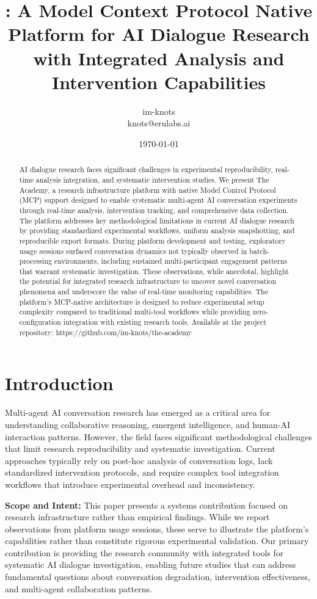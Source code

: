 \documentclass[11pt,letterpaper]{article}
\title{\theacademy{}: A Model Context Protocol Native Platform for AI Dialogue Research with Integrated Analysis and Intervention Capabilities}
\author{
im-knots \\
knots@erulabs.ai
}
\date{\today}
\newcommand{\theacademy}{The Academy}
\newcommand{\mcp}{MCP}
\begin{document}
\maketitle

\begin{abstract}
AI dialogue research faces significant challenges in experimental reproducibility, real-time analysis integration, and systematic intervention studies. We present \theacademy{}, a research infrastructure platform with native Model Control Protocol (\mcp{}) support designed to enable systematic multi-agent AI conversation experiments through real-time analysis, intervention tracking, and comprehensive data collection. The platform addresses key methodological limitations in current AI dialogue research by providing standardized experimental workflows, uniform analysis snapshotting, and reproducible export formats. During platform development and testing, exploratory usage sessions surfaced conversation dynamics not typically observed in batch-processing environments, including sustained multi-participant engagement patterns that warrant systematic investigation. These observations, while anecdotal, highlight the potential for integrated research infrastructure to uncover novel conversation phenomena and underscore the value of real-time monitoring capabilities. The platform's \mcp{}-native architecture is designed to reduce experimental setup complexity compared to traditional multi-tool workflows while providing zero-configuration integration with existing research tools.
Available at the project repository: https://github.com/im-knots/the-academy
\end{abstract}

\section{Introduction}

Multi-agent AI conversation research has emerged as a critical area for understanding collaborative reasoning, emergent intelligence, and human-AI interaction patterns. However, the field faces significant methodological challenges that limit research reproducibility and systematic investigation. Current approaches typically rely on post-hoc analysis of conversation logs, lack standardized intervention protocols, and require complex tool integration workflows that introduce experimental overhead and inconsistency.

\textbf{Scope and Intent:} This paper presents a systems contribution focused on research infrastructure rather than empirical findings. While we report observations from platform usage sessions, these serve to illustrate the platform's capabilities rather than constitute rigorous experimental validation. Our primary contribution is providing the research community with integrated tools for systematic AI dialogue investigation, enabling future studies that can address fundamental questions about conversation degradation, intervention effectiveness, and multi-agent collaboration patterns.
\end{document}
